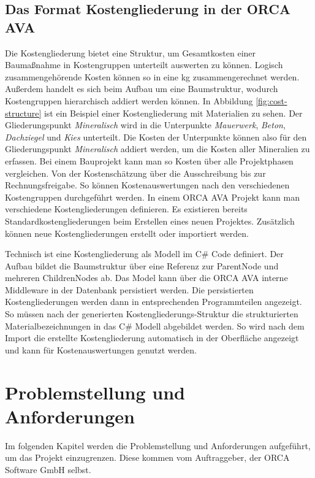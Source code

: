 \section{Das Format Kostengliederung in der ORCA AVA}
\label{c:basics:coststructure}
Die Kostengliederung bietet eine Struktur, um Gesamtkosten einer Baumaßnahme in Kostengruppen unterteilt auswerten zu können. Logisch zusammengehörende Kosten können so in eine \ac{kg} zusammengerechnet werden. Außerdem handelt es sich beim Aufbau um eine Baumstruktur, wodurch Kostengruppen hierarchisch addiert werden können. In Abbildung \ref{fig:cost-structure} ist ein Beispiel einer Kostengliederung mit Materialien zu sehen. Der Gliederungspunkt \textit{Mineralisch} wird in die Unterpunkte \textit{Mauerwerk}, \textit{Beton}, \textit{Dachziegel} und \textit{Kies} unterteilt. Die Kosten der Unterpunkte können also für den Gliederungspunkt \textit{Mineralisch} addiert werden, um die Kosten aller Mineralien zu erfassen.
Bei einem Bauprojekt kann man so Kosten über alle Projektphasen vergleichen. Von der Kostenschätzung über die  Ausschreibung bis zur Rechnungsfreigabe. So können Kostenauswertungen nach den verschiedenen Kostengruppen durchgeführt werden. In einem ORCA AVA Projekt kann man verschiedene Kostengliederungen definieren. Es existieren bereits Standardkostengliederungen beim Erstellen eines neuen Projektes. Zusätzlich können neue Kostengliederungen erstellt oder importiert werden.\citep{helpdesk-kostengliederungen}


Technisch ist eine Kostengliederung als Modell im C\# Code definiert. Der Aufbau bildet die Baumstruktur über eine Referenz zur ParentNode und mehreren ChildrenNodes ab. Das Model kann über die ORCA AVA interne Middleware in der Datenbank persistiert werden. Die persistierten Kostengliederungen werden dann in entsprechenden Programmteilen angezeigt.
So müssen nach der generierten Kostengliederungs-Struktur die strukturierten Materialbezeichnungen in das C\# Modell abgebildet werden. So wird nach dem Import die erstellte Kostengliederung automatisch in der Oberfläche angezeigt und kann für Kostenauswertungen genutzt werden.


\chapter{Problemstellung und Anforderungen}
\label{c:requirements}
Im folgenden Kapitel werden die Problemstellung und Anforderungen aufgeführt, um das Projekt einzugrenzen. Diese kommen vom Auftraggeber, der \glqq ORCA Software GmbH\grqq{} selbst.


